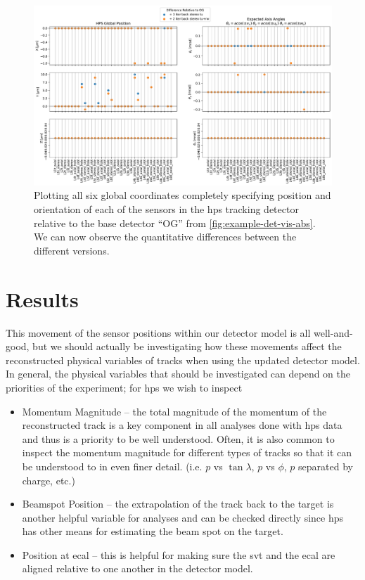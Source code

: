 \begin{figure}
  \centering
  \includegraphics[width=\textwidth]{figures/hps/alignment/example-det-vis-diff.pdf}
  \caption{Plotting all six global coordinates completely specifying position and
    orientation of each of the sensors in the \ac{hps} tracking detector relative to
    the base detector ``OG'' from \cref{fig:example-det-vis-abs}. We can now observe
    the quantitative differences between the different versions.}
  \label{fig:example-det-vis-diff}
\end{figure}

\section{Results}
This movement of the sensor positions within our detector model is all well-and-good,
but we should actually be investigating how these movements affect the reconstructed
physical variables of tracks when using the updated detector model.
In general, the physical variables that should be investigated can depend on the
priorities of the experiment; for \ac{hps} we wish to inspect
\begin{itemize}
  \item Momentum Magnitude -- the total magnitude of the momentum of the reconstructed
    track is a key component in all analyses done with \ac{hps} data and thus is a
    priority to be well understood. Often, it is also common to inspect the momentum
    magnitude for different types of tracks so that it can be understood to in even
    finer detail. (i.e. $p$ vs $\tan\lambda$, $p$ vs $\phi$, $p$ separated by charge,
    etc.)
  \item Beamspot Position -- the extrapolation of the track back to the target is
    another helpful variable for analyses and can be checked directly since \ac{hps}
    has other means for estimating the beam spot on the target.
  \item Position at \ac{ecal} -- this is helpful for making sure the \ac{svt} and
    the \ac{ecal} are aligned relative to one another in the detector model.
\end{itemize}

